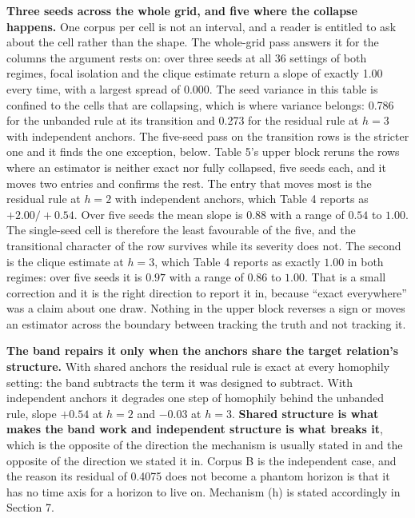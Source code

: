 \documentclass[twoside,11pt]{article}
\begin{document}
\textbf{Three seeds across the whole grid, and five where the collapse happens.} One corpus per cell is not an interval, and a reader is entitled to ask about the cell rather than the shape. The whole-grid pass answers it for the columns the argument rests on: over three seeds at all 36 settings of both regimes, focal isolation and the clique estimate return a slope of exactly 1.00 every time, with a largest spread of 0.000. The seed variance in this table is confined to the cells that are collapsing, which is where variance belongs: 0.786 for the unbanded rule at its transition and 0.273 for the residual rule at \(h = 3\) with independent anchors. The five-seed pass on the transition rows is the stricter one and it finds the one exception, below. Table 5's upper block reruns the rows where an estimator is neither exact nor fully collapsed, five seeds each, and it moves two entries and confirms the rest. The entry that moves most is the residual rule at \(h = 2\) with independent anchors, which Table 4 reports as \(+ 2.00/ + 0.54\). Over five seeds the mean slope is \(0.88\) with a range of \(0.54\) to \(1.00\). The single-seed cell is therefore the least favourable of the five, and the transitional character of the row survives while its severity does not. The second is the clique estimate at \(h = 3\), which Table 4 reports as exactly \(1.00\) in both regimes: over five seeds it is \(0.97\) with a range of \(0.86\) to \(1.00\). That is a small correction and it is the right direction to report it in, because ``exact everywhere'' was a claim about one draw. Nothing in the upper block reverses a sign or moves an estimator across the boundary between tracking the truth and not tracking it.

\textbf{The band repairs it only when the anchors share the target relation's structure.} With shared anchors the residual rule is exact at every homophily setting: the band subtracts the term it was designed to subtract. With independent anchors it degrades one step of homophily behind the unbanded rule, slope \(+ 0.54\) at \(h = 2\) and \(- 0.03\) at \(h = 3\). \textbf{Shared structure is what makes the band work and independent structure is what breaks it}, which is the opposite of the direction the mechanism is usually stated in and the opposite of the direction we stated it in. Corpus B is the independent case, and the reason its residual of 0.4075 does not become a phantom horizon is that it has no time axis for a horizon to live on. Mechanism (h) is stated accordingly in Section 7.
\end{document}
